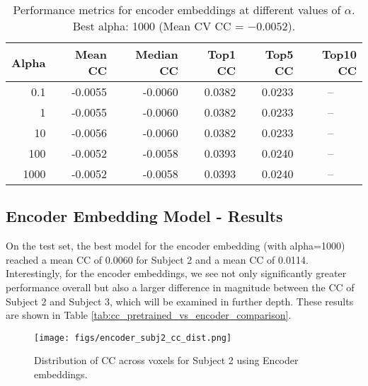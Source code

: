 \documentclass[10pt,letterpaper]{article}
\begin{document}
\begin{table}[ht]
\centering
\caption{Performance metrics for encoder embeddings at different values of $\alpha$. Best alpha: 1000 (Mean CV CC = $-0.0052$).}
\label{tab:encoder_cv}
\begin{tabular}{rrrrrr}
\toprule
\textbf{Alpha} & \textbf{Mean CC} & \textbf{Median CC} & \textbf{Top1 CC} & \textbf{Top5 CC} & \textbf{Top10 CC} \\
\midrule
0.1   & -0.0055 & -0.0060 & 0.0382 & 0.0233 & \multicolumn{1}{c}{--} \\
1     & -0.0055 & -0.0060 & 0.0382 & 0.0233 & \multicolumn{1}{c}{--} \\
10    & -0.0056 & -0.0060 & 0.0382 & 0.0233 & \multicolumn{1}{c}{--} \\
100   & -0.0052 & -0.0058 & 0.0393 & 0.0240 & \multicolumn{1}{c}{--} \\
1000  & -0.0052 & -0.0058 & 0.0393 & 0.0240 & \multicolumn{1}{c}{--} \\
\bottomrule
\end{tabular}
\end{table}

\subsection{Encoder Embedding Model - Results}

On the test set, the best model for the encoder embedding (with alpha=1000) reached a mean CC of 0.0060 for Subject 2 and a mean CC of 0.0114. Interestingly, for the encoder embeddings, we see not only significantly greater performance overall but also a larger difference in magnitude between the CC of Subject 2 and Subject 3, which will be examined in further depth. These results are shown in Table \ref{tab:cc_pretrained_vs_encoder_comparison}.


\begin{figure}[ht]
    \centering
    \texttt{[image: figs/encoder\_subj2\_cc\_dist.png]}
    \caption{Distribution of CC across voxels for Subject 2 using Encoder embeddings.}
    \label{fig:cc_dist_encoder_subject_2}
\end{figure}
\end{document}
